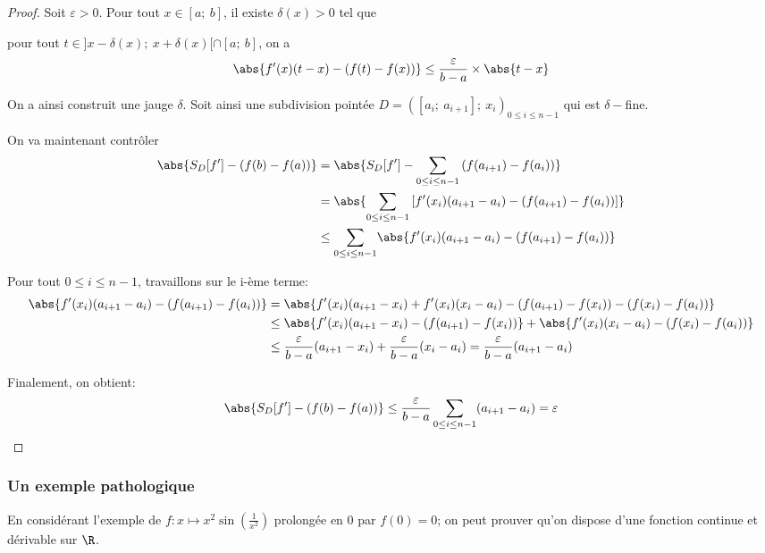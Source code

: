 \begin{proof}
Soit $\varepsilon>0$. Pour tout $x \in [a;~b]$, il existe $\delta(x)>0$ tel que 

pour tout $t \in ]x-\delta(x);~x+\delta(x)[ \cap [a;~b]$, on a
\[
\abs{f'(x)(t-x)-(f(t)-f(x))} \leq \dfrac{\varepsilon}{b-a} \times \abs{t-x}
\]

On a ainsi construit une jauge $\delta$. Soit ainsi une subdivision pointée $D=\left ([a_i;~a_{i+1}];~x_i\right )_{0 \leq i \leq n-1}$ qui est $\delta-$fine.

\medskip
On va maintenant contrôler
\begin{align*}
\abs{S_D[f']-(f(b)-f(a))} & = \abs{S_D[f']-\displaystyle{\sum \limits_{0 \leq i \leq n-1}} \left (f(a_{i+1})-f(a_i)\right )} \\
 & = \abs{\displaystyle{\sum \limits_{0 \leq i \leq n-1}} \left [f'(x_i)(a_{i+1}-a_i)-\left (f(a_{i+1})-f(a_i)\right )\right ] } \\
 & \leq \displaystyle{\sum \limits_{0 \leq i \leq n-1}} \abs{f'(x_i)(a_{i+1}-a_i)-\left (f(a_{i+1})-f(a_i)\right )}
\end{align*}

Pour tout $0 \leq i \leq n-1$, travaillons sur le i-ème terme:
\begin{align*}
\abs{f'(x_i)(a_{i+1}-a_i)-\left (f(a_{i+1})-f(a_i)\right )} & = \abs{f'(x_i)(a_{i+1}-x_i)+f'(x_i)(x_i-a_i)-\left (f(a_{i+1})-f(x_i)\right )-\left (f(x_i)-f(a_i)\right )} \\
 & \leq \abs{f'(x_i)(a_{i+1}-x_i)-\left (f(a_{i+1})-f(x_i)\right )} + \abs{f'(x_i)(x_i-a_i) - \left (f(x_i)-f(a_i)\right )} \\
 & \leq \dfrac{\varepsilon}{b-a} (a_{i+1}-x_i) + \dfrac{\varepsilon}{b-a} (x_i-a_i)  = \dfrac{\varepsilon}{b-a} (a_{i+1}-a_i)
\end{align*}

Finalement, on obtient:
\[
\abs{S_D[f']-(f(b)-f(a))} \leq \dfrac{\varepsilon}{b-a} \, \displaystyle{\sum \limits_{0 \leq i \leq n-1}} (a_{i+1}-a_i) = \varepsilon
\]
\end{proof}


\subsubsection{Un exemple pathologique}

En considérant l'exemple de $f: x \mapsto x^2 \sin\left (\frac{1}{x^2} \right )$ prolongée en $0$ par $f(0)=0$; on peut prouver qu'on dispose d'une fonction continue et dérivable sur $\R$.


